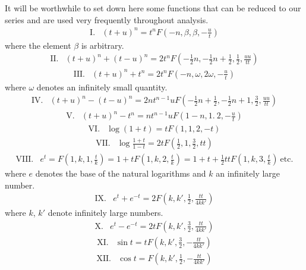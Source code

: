 It will be worthwhile to set down here some functions that can be reduced to our series and are used very frequently throughout analysis.
\[
\begin{array}{rl}
\mathrm{I.}&(t+u)^n=t^nF(-n,\beta,\beta,-\frac{u}{t})
\end{array}
\]
where the element $\beta$ is arbitrary.
\[
\begin{array}{rl}
\mathrm{II.}&(t+u)^n+(t-u)^n=2t^nF(-\frac{1}{2}n,-\frac{1}{2}n+\frac{1}{2},\frac{1}{2},\frac{uu}{tt})
\end{array}
\]
\[
\begin{array}{rl}
\mathrm{III.}&(t+u)^n+t^n=2t^nF(-n,\omega,2\omega,-\frac{u}{t})
\end{array}
\]
where $\omega$ denotes an infinitely small quantity.
\[
\begin{array}{rl}
\mathrm{IV.}&(t+u)^n-(t-u)^n=2nt^{n-1}uF(-\frac{1}{2}n+\frac{1}{2},-\frac{1}{2}n+1,\frac{3}{2},\frac{uu}{tt})
\end{array}
\]
\[
\begin{array}{rl}
\mathrm{V.}&(t+u)^n-t^n=nt^{n-1}uF(1-n,1.\ 2,-\frac{u}{t})
\end{array}
\]
\[
\begin{array}{rl}
\mathrm{VI.}&\log(1+t)=tF(1,1,2,-t)
\end{array}
\]
\[
\begin{array}{rl}
\mathrm{VII.}&\log\frac{1+t}{1-t}=2tF(\frac{1}{2},1,\frac{3}{2},tt)
\end{array}
\]
\[
\begin{array}{rl}
\mathrm{VIII.}&e^t=F(1,k,1,\frac{t}{k})=1+tF(1,k,2,\frac{t}{k})=1+t+\frac{1}{2}ttF(1,k,3,\frac{t}{k})\ \mbox{etc.}
\end{array}
\]
where $e$ denotes the base of the natural logarithms and $k$ an infinitely large number.
\[
\begin{array}{rl}
\mathrm{IX.}&e^t+e^{-t}=2F(k,k',\frac{1}{2},\frac{tt}{4kk'})
\end{array}
\]
where $k$, $k'$ denote infinitely large numbers.
\[
\begin{array}{rl}
\mathrm{X.}&e^t-e^{-t}=2tF(k,k',\frac{3}{2},\frac{tt}{4kk'})
\end{array}
\]
\[
\begin{array}{rl}
\mathrm{XI.}&\sin t=tF(k,k',\frac{3}{2},-\frac{tt}{4kk'})
\end{array}
\]
\[
\begin{array}{rl}
\mathrm{XII.}&\cos t=F(k,k',\frac{1}{2},-\frac{tt}{4kk'})
\end{array}
\]
